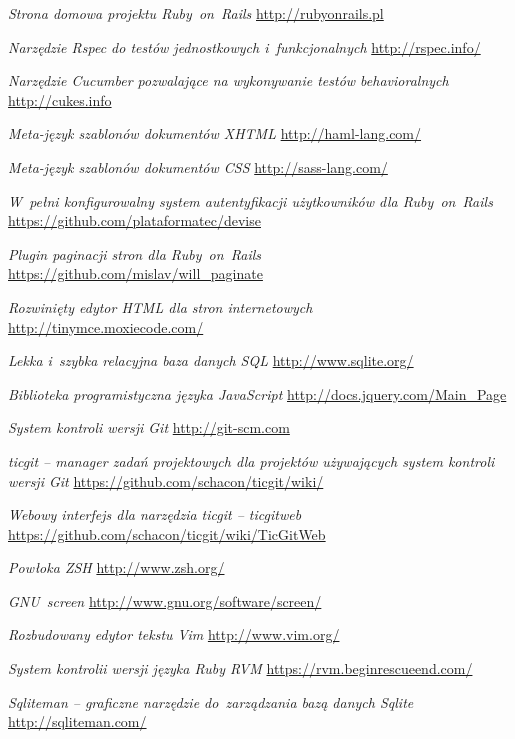 \begin{thebibliography}{99}

   \emph{Strona domowa projektu Ruby~on~Rails} \url{http://rubyonrails.pl}

   \emph{Narzędzie Rspec do testów jednostkowych i~funkcjonalnych} \url{http://rspec.info/}

   \emph{Narzędzie Cucumber pozwalające na wykonywanie testów behavioralnych} \url{http://cukes.info}

   \emph{Meta-język szablonów dokumentów XHTML} \url{http://haml-lang.com/}

   \emph{Meta-język szablonów dokumentów CSS} \url{http://sass-lang.com/}

   \emph{W~pełni konfigurowalny system autentyfikacji użytkowników dla Ruby~on~Rails} \url{https://github.com/plataformatec/devise}

   \emph{Plugin paginacji stron dla Ruby~on~Rails} \url{https://github.com/mislav/will_paginate}

   \emph{Rozwinięty edytor HTML dla stron internetowych} \url{http://tinymce.moxiecode.com/}

   \emph{Lekka i~szybka relacyjna baza danych SQL} \url{http://www.sqlite.org/}

   \emph{Biblioteka programistyczna języka JavaScript} \url{http://docs.jquery.com/Main_Page}

   \emph{System kontroli wersji Git} \url{http://git-scm.com}

   \emph{ticgit -- manager zadań projektowych dla projektów używających system kontroli wersji Git} \url{https://github.com/schacon/ticgit/wiki/}

   \emph{Webowy interfejs dla narzędzia ticgit -- ticgitweb} \url{https://github.com/schacon/ticgit/wiki/TicGitWeb}

   \emph{Powłoka ZSH} \url{http://www.zsh.org/}

   \emph{GNU~screen} \url{http://www.gnu.org/software/screen/}

   \emph{Rozbudowany edytor tekstu Vim} \url{http://www.vim.org/}

   \emph{System kontrolii wersji języka Ruby RVM} \url{https://rvm.beginrescueend.com/}

   \emph{Sqliteman -- graficzne narzędzie do~zarządzania bazą danych Sqlite} \url{http://sqliteman.com/}


\end{thebibliography}
